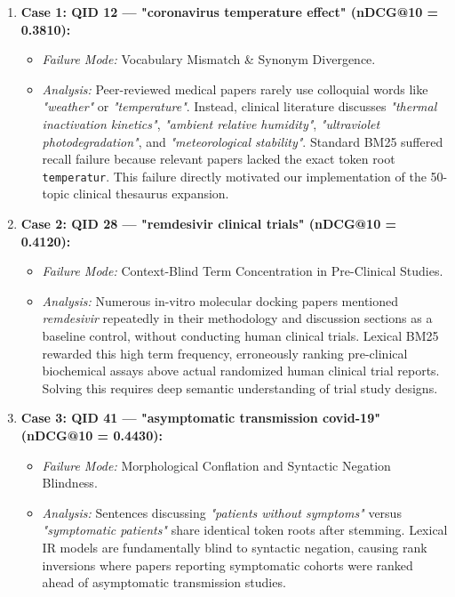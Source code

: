 ﻿\documentclass[9pt,a4paper]{article}
\begin{document}
\begin{enumerate}
    \item \textbf{Case 1: QID 12 --- "coronavirus temperature effect" (nDCG@10 = 0.3810):}
    \begin{itemize}
        \item \textit{Failure Mode:} Vocabulary Mismatch \& Synonym Divergence.
        \item \textit{Analysis:} Peer-reviewed medical papers rarely use colloquial words like \textit{"weather"} or \textit{"temperature"}. Instead, clinical literature discusses \textit{"thermal inactivation kinetics"}, \textit{"ambient relative humidity"}, \textit{"ultraviolet photodegradation"}, and \textit{"meteorological stability"}. Standard BM25 suffered recall failure because relevant papers lacked the exact token root \texttt{temperatur}. This failure directly motivated our implementation of the 50-topic clinical thesaurus expansion.
    \end{itemize}
    \item \textbf{Case 2: QID 28 --- "remdesivir clinical trials" (nDCG@10 = 0.4120):}
    \begin{itemize}
        \item \textit{Failure Mode:} Context-Blind Term Concentration in Pre-Clinical Studies.
        \item \textit{Analysis:} Numerous in-vitro molecular docking papers mentioned \textit{remdesivir} repeatedly in their methodology and discussion sections as a baseline control, without conducting human clinical trials. Lexical BM25 rewarded this high term frequency, erroneously ranking pre-clinical biochemical assays above actual randomized human clinical trial reports. Solving this requires deep semantic understanding of trial study designs.
    \end{itemize}
    \item \textbf{Case 3: QID 41 --- "asymptomatic transmission covid-19" (nDCG@10 = 0.4430):}
    \begin{itemize}
        \item \textit{Failure Mode:} Morphological Conflation and Syntactic Negation Blindness.
        \item \textit{Analysis:} Sentences discussing \textit{"patients without symptoms"} versus \textit{"symptomatic patients"} share identical token roots after stemming. Lexical IR models are fundamentally blind to syntactic negation, causing rank inversions where papers reporting symptomatic cohorts were ranked ahead of asymptomatic transmission studies.
    \end{itemize}
\end{enumerate}
\end{document}
